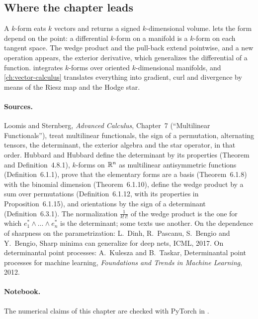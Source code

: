 \begin{notechapter}
\section{Where the chapter leads}\label{multilinear-algebra:sec:outlook}

A $k$-form eats $k$ vectors and returns a signed $k$-dimensional
volume.  lets the form depend on the point:
a differential $k$-form on a manifold is a $k$-form on each tangent
space. The wedge product and the pull-back extend pointwise, and a new
operation appears, the exterior derivative, which generalizes the
differential of a function.  integrates $k$-forms over
oriented $k$-dimensional manifolds, and \cref{ch:vector-calculus}
translates everything into gradient, curl and divergence by means of
the Riesz map and the Hodge star.

\paragraph{Sources.} Loomis and Sternberg, \emph{Advanced Calculus},
Chapter~7 (``Multilinear Functionals''), treat multilinear functionals,
the sign of a permutation, alternating tensors, the determinant, the
exterior algebra and the star operator, in that order. Hubbard and
Hubbard define the determinant by its properties (Theorem and
Definition~4.8.1), $k$-forms on $\mathbb{R}^n$ as multilinear antisymmetric
functions (Definition~6.1.1), prove that the elementary forms are a
basis (Theorem~6.1.8) with the binomial dimension (Theorem~6.1.10),
define the wedge product by a sum over permutations
(Definition~6.1.12, with its properties in Proposition~6.1.15), and
orientations by the sign of a determinant (Definition~6.3.1). The
normalization $\frac1{k!\,l!}$ of the wedge product is the one for
which $e_1^*\wedge\dots\wedge e_n^*$ is the determinant; some texts use
another. On the dependence of sharpness on the parametrization:
L.~Dinh, R.~Pascanu, S.~Bengio and Y.~Bengio, Sharp minima can
generalize for deep nets, ICML, 2017. On determinantal point processes:
A.~Kulesza and B.~Taskar, Determinantal point processes for machine
learning, \emph{Foundations and Trends in Machine Learning}, 2012.

\paragraph{Notebook.} The numerical claims of this chapter are checked
with PyTorch in .


\end{notechapter}
